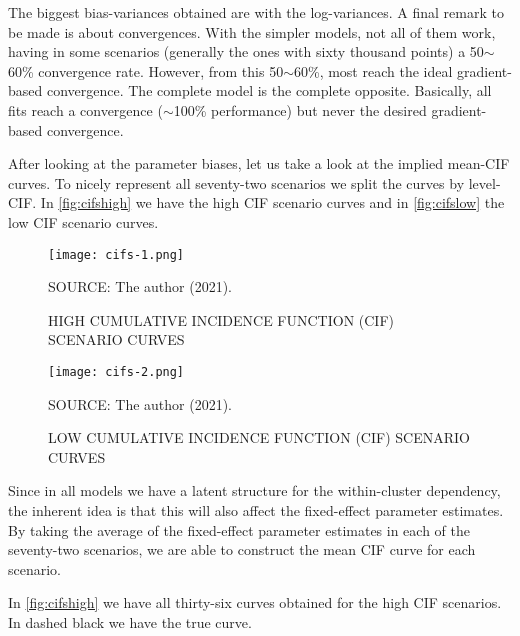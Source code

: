 The biggest bias-variances obtained are with the log-variances. A final
remark to be made is about convergences. With the simpler models, not
all of them work, having in some scenarios (generally the ones with
sixty thousand points) a 50\(\sim\)60\% convergence rate. However, from
this 50\(\sim\)60\%, most reach the ideal gradient-based
convergence. The complete model is the complete opposite. Basically, all
fits reach a convergence (\(\sim\)100\% performance) but never the
desired gradient-based convergence.

After looking at the parameter biases, let us take a look at the implied
mean-CIF curves. To nicely represent all seventy-two scenarios we split
the curves by level-CIF. In \autoref{fig:cifshigh} we have the high CIF
scenario curves and in \autoref{fig:cifslow} the low CIF scenario
curves.

\begin{figure}[H]
 \setlength{\abovecaptionskip}{.0001pt}
 \caption{HIGH CUMULATIVE INCIDENCE FUNCTION (CIF) SCENARIO CURVES}
 \vspace{0.2cm}\centering
 \texttt{[image: cifs-1.png]}\\
 \begin{footnotesize}
  SOURCE: The author (2021).
 \end{footnotesize}
 \label{fig:cifshigh}
\end{figure}

\begin{figure}[H]
 \setlength{\abovecaptionskip}{.0001pt}
 \caption{LOW CUMULATIVE INCIDENCE FUNCTION (CIF) SCENARIO CURVES}
 \vspace{0.2cm}\centering
 \texttt{[image: cifs-2.png]}\\
 \begin{footnotesize}
  SOURCE: The author (2021).
 \end{footnotesize}
 \label{fig:cifslow}
\end{figure}

Since in all models we have a latent structure for the within-cluster
dependency, the inherent idea is that this will also affect the
fixed-effect parameter estimates. By taking the average of the
fixed-effect parameter estimates in each of the seventy-two scenarios,
we are able to construct the mean CIF curve for each scenario.

In \autoref{fig:cifshigh} we have all thirty-six curves obtained for the
high CIF scenarios. In dashed black we have the true curve.

